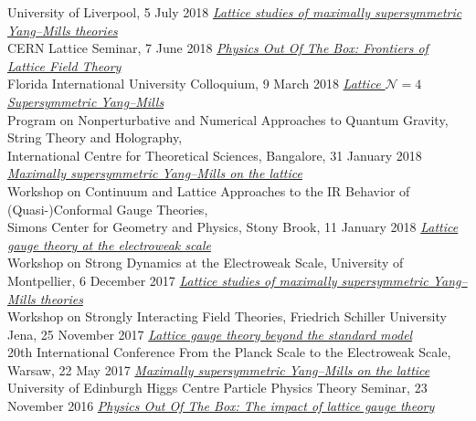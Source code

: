 \begin{spacelist}
\begin{revnumerate}
      University of Liverpool, 5 July 2018
    \pagebreakitem
      \textit{\href{http://www.davidschaich.net/talks/1806CERN.pdf}{Lattice studies of maximally supersymmetric Yang--Mills theories}} \\
      CERN Lattice Seminar, 7 June 2018
    \pagebreakitem
      \textit{\href{http://www.davidschaich.net/talks/1803FIU.pdf}{Physics Out Of The Box: Frontiers of Lattice Field Theory}} \\
      Florida International University Colloquium, 9 March 2018
    \pagebreakitem
      \textit{\href{http://www.davidschaich.net/talks/1801Bangalore.pdf}{Lattice $\mathcal N = 4$ Supersymmetric Yang--Mills}} \\
      Program on Nonperturbative and Numerical Approaches to Quantum Gravity, String Theory and Holography, \\ International Centre for Theoretical Sciences, Bangalore, 31 January 2018
    \pagebreakitem
      \textit{\href{http://www.davidschaich.net/talks/1801StonyBrook.pdf}{Maximally supersymmetric Yang--Mills on the lattice}} \\
      Workshop on Continuum and Lattice Approaches to the IR Behavior of (Quasi-)Conformal Gauge Theories, \\ Simons Center for Geometry and Physics, Stony Brook, 11 January 2018
    \pagebreakitem
      \textit{\href{http://www.davidschaich.net/talks/1712Montpellier.pdf}{Lattice gauge theory at the electroweak scale}} \\
      Workshop on Strong Dynamics at the Electroweak Scale, University of Montpellier, 6 December 2017
    \pagebreakitem
      \textit{\href{http://www.davidschaich.net/talks/1711Jena.pdf}{Lattice studies of maximally supersymmetric Yang--Mills theories}} \\
      Workshop on Strongly Interacting Field Theories, Friedrich Schiller University Jena, 25 November 2017
    \pagebreakitem
      \textit{\href{http://www.davidschaich.net/talks/1705Planck.pdf}{Lattice gauge theory beyond the standard model}} \\
      20th International Conference From the Planck Scale to the Electroweak Scale, Warsaw, 22 May 2017
    \pagebreakitem
      \textit{\href{http://www.davidschaich.net/talks/1611Edinburgh.pdf}{Maximally supersymmetric Yang--Mills on the lattice}} \\
      University of Edinburgh Higgs Centre Particle Physics Theory Seminar, 23 November 2016
    \pagebreakitem
      \textit{\href{http://www.davidschaich.net/talks/1604Glasgow.pdf}{Physics Out Of The Box: The impact of lattice gauge theory}} \\

\end{revnumerate}
\end{spacelist}
